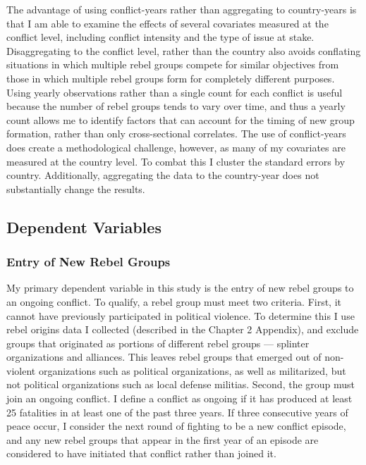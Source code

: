 \documentclass[12pt,]{book}
\theoremstyle{definition}
\theoremstyle{definition}
\theoremstyle{definition}
\theoremstyle{remark}
\begin{document}
The advantage of using conflict-years rather than aggregating to
country-years is that I am able to examine the effects of several
covariates measured at the conflict level, including conflict intensity
and the type of issue at stake. Disaggregating to the conflict level,
rather than the country also avoids conflating situations in which
multiple rebel groups compete for similar objectives from those in which
multiple rebel groups form for completely different purposes. Using
yearly observations rather than a single count for each conflict is
useful because the number of rebel groups tends to vary over time, and
thus a yearly count allows me to identify factors that can account for
the timing of new group formation, rather than only cross-sectional
correlates. The use of conflict-years does create a methodological
challenge, however, as many of my covariates are measured at the country
level. To combat this I cluster the standard errors by country.
Additionally, aggregating the data to the country-year does not
substantially change the results.

\hypertarget{dependent-variables-1}{%
\subsection{Dependent Variables}\label{dependent-variables-1}}

\hypertarget{entry-of-new-rebel-groups}{%
\subsubsection*{Entry of New Rebel
Groups}\label{entry-of-new-rebel-groups}}

My primary dependent variable in this study is the entry of new rebel
groups to an ongoing conflict. To qualify, a rebel group must meet two
criteria. First, it cannot have previously participated in political
violence. To determine this I use rebel origins data I collected
(described in the Chapter 2 Appendix), and exclude groups that
originated as portions of different rebel groups --- splinter
organizations and alliances. This leaves rebel groups that emerged out
of non-violent organizations such as political organizations, as well as
militarized, but not political organizations such as local defense
militias. Second, the group must join an ongoing conflict. I define a
conflict as ongoing if it has produced at least 25 fatalities in at
least one of the past three years. If three consecutive years of peace
occur, I consider the next round of fighting to be a new conflict
episode, and any new rebel groups that appear in the first year of an
episode are considered to have initiated that conflict rather than
joined it.
\end{document}
